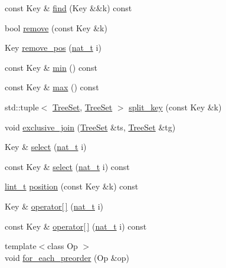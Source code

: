 \begin{DoxyCompactItemize}
\item 
const Key \& \hyperlink{class_designar_1_1_tree_set_ad07353fe7781a5fe321f3f8b84fc23c7}{find} (Key \&\&k) const
\item 
bool \hyperlink{class_designar_1_1_tree_set_aa0a8a4c41fe3c495759d555f2de08661}{remove} (const Key \&k)
\item 
Key \hyperlink{class_designar_1_1_tree_set_ade9d7fc31ba5f1b0313a9182f2f71675}{remove\+\_\+pos} (\hyperlink{namespace_designar_aa72662848b9f4815e7bf31a7cf3e33d1}{nat\+\_\+t} i)
\item 
const Key \& \hyperlink{class_designar_1_1_tree_set_a12b0c311162ba44de775258ef9897800}{min} () const
\item 
const Key \& \hyperlink{class_designar_1_1_tree_set_a7456e486d8d35aa2c21387389cab091d}{max} () const
\item 
std\+::tuple$<$ \hyperlink{class_designar_1_1_tree_set}{Tree\+Set}, \hyperlink{class_designar_1_1_tree_set}{Tree\+Set} $>$ \hyperlink{class_designar_1_1_tree_set_a36f9e4e6f76d9767327ba73115841f89}{split\+\_\+key} (const Key \&k)
\item 
void \hyperlink{class_designar_1_1_tree_set_ad620aa099eb1b4d40db8470ea6c1d5bc}{exclusive\+\_\+join} (\hyperlink{class_designar_1_1_tree_set}{Tree\+Set} \&ts, \hyperlink{class_designar_1_1_tree_set}{Tree\+Set} \&tg)
\item 
Key \& \hyperlink{class_designar_1_1_tree_set_a1592ef402d18c3e8664c56d9554ae993}{select} (\hyperlink{namespace_designar_aa72662848b9f4815e7bf31a7cf3e33d1}{nat\+\_\+t} i)
\item 
const Key \& \hyperlink{class_designar_1_1_tree_set_a811d76a361633a8de4a37042fec3b971}{select} (\hyperlink{namespace_designar_aa72662848b9f4815e7bf31a7cf3e33d1}{nat\+\_\+t} i) const
\item 
\hyperlink{namespace_designar_a9d113d66a39e82b73727c72cd3a52f73}{lint\+\_\+t} \hyperlink{class_designar_1_1_tree_set_a3d10471f0d45ebbf63904fcb57f0ef5d}{position} (const Key \&k) const
\item 
Key \& \hyperlink{class_designar_1_1_tree_set_a020ff992a46723b3f88aa53e5196511b}{operator\mbox{[}$\,$\mbox{]}} (\hyperlink{namespace_designar_aa72662848b9f4815e7bf31a7cf3e33d1}{nat\+\_\+t} i)
\item 
const Key \& \hyperlink{class_designar_1_1_tree_set_abceb0950aea4ba6409a72f6765ba1deb}{operator\mbox{[}$\,$\mbox{]}} (\hyperlink{namespace_designar_aa72662848b9f4815e7bf31a7cf3e33d1}{nat\+\_\+t} i) const
\item 
{\footnotesize template$<$class Op $>$ }\\void \hyperlink{class_designar_1_1_tree_set_ae464b1e41281166a0beda95787f6f303}{for\+\_\+each\+\_\+preorder} (Op \&op)

\end{DoxyCompactItemize}
